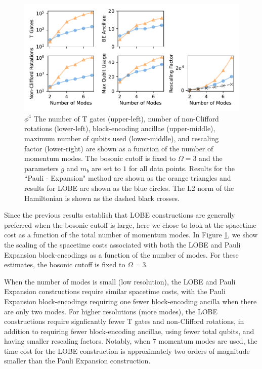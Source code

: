 \begin{figure}
    \label{fig:phi4}
    \includegraphics[width = 16cm]{figures/phi4-resolution-3.pdf}
    \caption{
        \textbf{$\phi^4$}
        The number of T gates (upper-left), number of non-Clifford rotations (lower-left), block-encoding ancillae (upper-middle), maximum number of qubits used (lower-middle), and rescaling factor (lower-right) are shown as a function of the number of momentum modes.
        The bosonic cutoff is fixed to $\Omega = 3$ and the parameters $g$ and $m_b$ are set to $1$ for all data points.
        Results for the ``Pauli - Expansion" method are shown as the orange triangles and results for LOBE are shown as the blue circles.
        The L2 norm of the Hamiltonian is shown as the dashed black crosses.
    }
\end{figure}

Since the previous results establish that LOBE constructions are generally preferred when the bosonic cutoff is large, here we chose to look at the spacetime cost as a function of the total number of momentum modes.
In Figure \ref{fig:phi4}, we show the scaling of the spacetime costs associated with both the LOBE and Pauli Expansion block-encodings as a function of the number of modes.
For these estimates, the bosonic cutoff is fixed to $\Omega = 3$.

When the number of modes is small (low resolution), the LOBE and Pauli Expansion constructions require similar spacetime costs, with the Pauli Expansion block-encodings requiring one fewer block-encoding ancilla when there are only two modes.
For higher resolutions (more modes), the LOBE constructions require signficantly fewer T gates and non-Clifford rotations, in addition to requiring fewer block-encoding ancillae, using fewer total qubits, and having smaller rescaling factors.
Notably, when $7$ momentum modes are used, the time cost for the LOBE construction is approximately two orders of magnitude smaller than the Pauli Expansion construction.
